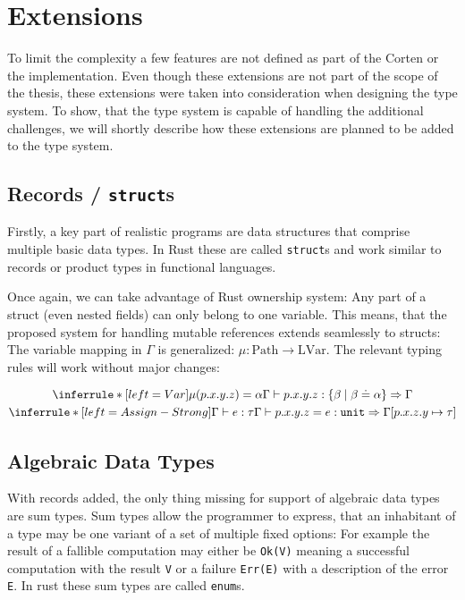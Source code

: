 \documentclass{book}
\newcommand{\code}[1]{\texttt{#1}}
\theoremstyle{definition}
\begin{document}
\section{Extensions}


To limit the complexity a few features are not defined as part of the Corten or the implementation.
Even though these extensions are not part of the scope of the thesis, these extensions were taken into consideration when designing the type system. To show, that the type system is capable of handling the additional challenges, we will shortly describe how these extensions are planned to be added to the type system.

\subsection{Records / \code{struct}s}

Firstly, a key part of realistic programs are data structures that comprise multiple basic data types. In Rust these are called \code{struct}s and work similar to records or product types in functional languages. 

Once again, we can take advantage of Rust ownership system: Any part of a struct (even nested fields) can only belong to one variable. This means, that the proposed system for handling mutable references extends seamlessly to structs: 
The variable mapping in $\Gamma$ is generalized: $\mu : \text{Path} \to \text{LVar}$. The relevant typing rules will work without major changes:

\begin{gather*}
  \inferrule*[left=Var]
    {\mu(p.x.y.z) = \alpha}
    {\Gamma \vdash p.x.y.z : \{ \beta \mid \beta \doteq \alpha \} \Rightarrow \Gamma}
    \\
  \inferrule*[left=Assign-Strong]
    {\Gamma \vdash e : \tau}
    {\Gamma \vdash p.x.y.z = e : \code{unit} \Rightarrow \Gamma[p.x.z.y \mapsto \tau]}
\end{gather*}

\subsection{Algebraic Data Types}

With records added, the only thing missing for support of algebraic data types are sum types.
Sum types allow the programmer to express, that an inhabitant of a type may be one variant of a set of multiple fixed options: For example the result of a fallible computation may either be \code{Ok(V)} meaning a successful computation with the result \code{V} or a failure \code{Err(E)} with a description of the error \code{E}.
In rust these sum types are called \code{enum}s.
\end{document}
